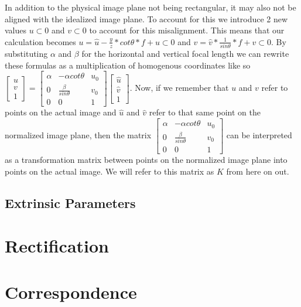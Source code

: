 In addition to the physical image plane not being rectangular, it may also not be aligned with the idealized image plane.  To
account for this we introduce 2 new values $u\subset{0}$ and $v\subset{0}$ to account for this misalignment.  This means that our 
calculation becomes $u=\hat{u}-\frac{y}{z} * cot \theta * f + u\subset{0}$ and $v=\hat{v} * \frac{1}{sin \theta} * f + 
v\subset{0}$. By substituting $\alpha$ and $\beta$ for the horizontal and vertical focal length we can rewrite these formulas as a 
multiplication of homogenous coordinates like so $\begin{bmatrix} u \\ v \\ 1 \end{bmatrix} = \begin{bmatrix} \alpha & -\alpha cot\theta & u_{0} \\ 0 & \frac{\beta}{sin\theta} & v_{0} \\ 0 & 0 & 1 \end{bmatrix} \begin{bmatrix}\hat{u} \\ \hat{v}\\ 1\end{bmatrix}$.  Now, if we remember that $u$ and $v$ refer to points on the actual image and $\hat{u}$ and $\hat{v}$ refer to that same point on the normalized image plane, then the matrix $\begin{bmatrix} \alpha & -\alpha cot\theta & u_{0} \\ 0 & \frac{\beta}{sin\theta} & v_{0} \\ 0 & 0 & 1 \end{bmatrix}$ can be interpreted as a transformation matrix between points on the normalized image plane into points on the actual image.  We will refer to this matrix as $K$ from here on out.

\subsection{Extrinsic Parameters}
\section{Rectification}

\section{Correspondence}